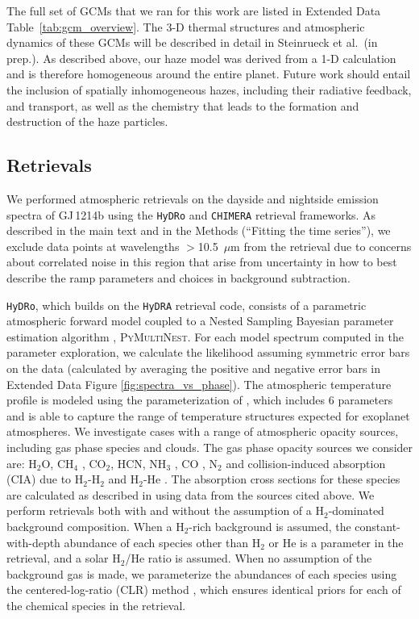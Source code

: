 \documentclass[pdflatex,sn-standardnature]{sn-jnl}%
\begin{document}
The full set of GCMs that we ran for this work are listed in Extended Data Table~\ref{tab:gcm_overview}. The 3-D thermal structures and atmospheric dynamics of these GCMs will be described in detail in Steinrueck et al.\ (in prep.).  As described above, our haze model was derived from a 1-D calculation and is therefore homogeneous around the entire planet.  Future work should entail the inclusion of spatially inhomogeneous hazes, including their radiative feedback, and transport, as well as the chemistry that leads to the formation and destruction of the haze particles.



\subsection*{Retrievals}
We performed atmospheric retrievals on the dayside and nightside emission spectra of GJ\,1214b using the \texttt{HyDRo} \citep{piette22} and \texttt{CHIMERA}  \citep{Line2013} retrieval frameworks. As described in the main text and in the Methods (``Fitting the time series''), we exclude data points at wavelengths $>$10.5~$\mu$m from the retrieval due to concerns about correlated noise in this region that arise from uncertainty in how to best describe the ramp parameters and choices in background subtraction.  

\texttt{HyDRo}, which builds on the \texttt{HyDRA} \citep{gandhi18,gandhi20,piette20} retrieval code, consists of a parametric atmospheric forward model coupled to a Nested Sampling Bayesian parameter estimation algorithm \citep{skilling06}, \textsc{PyMultiNest}\citep{feroz09,buchner14}. For each model spectrum computed in the parameter exploration, we calculate the likelihood assuming symmetric error bars on the data (calculated by averaging the positive and negative error bars in Extended Data Figure \ref{fig:spectra_vs_phase}). The atmospheric temperature profile is modeled using the parameterization of \citep{madhusudhan09}, which includes 6 parameters and is able to capture the range of temperature structures expected for exoplanet atmospheres. We investigate cases with a range of atmospheric opacity sources, including gas phase species and clouds. The gas phase opacity sources we consider are: H$_2$O\citep{rothman10}, CH$_4$ \citep{yurchenko13,yurchenko14}, CO$_2$\citep{rothman10}, HCN\citep{harris06}, NH$_3$ \citep{yurchenko11}, CO \citep{rothman10}, N$_2$ \citep{barklem16,western18} and collision-induced absorption (CIA) due to H$_2$-H$_2$ and H$_2$-He \citep{richard12}. The absorption cross sections for these species are calculated as described in \citep{gandhi17} using data from the sources cited above. We perform retrievals both with and without the assumption of a H$_2$-dominated background composition. When a H$_2$-rich background is assumed, the constant-with-depth abundance of each species other than H$_2$ or He is a parameter in the retrieval, and a solar H$_2$/He ratio is assumed. When no assumption of the background gas is made, we parameterize the abundances of each species using the centered-log-ratio (CLR) method \citep{benneke12,piette22}, which ensures identical priors for each of the chemical species in the retrieval.
\end{document}
